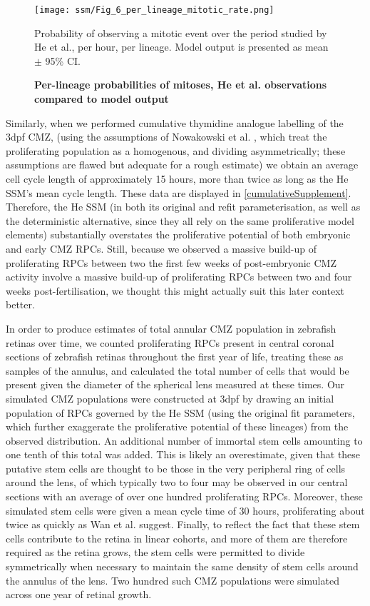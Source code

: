 \begin{figure}[!h]
\texttt{[image: ssm/Fig\_6\_per\_lineage\_mitotic\_rate.png]}
\caption{{\bf Per-lineage probabilities of mitoses, He et al. observations compared to model output}}
Probability of observing a mitotic event over the period studied by He et al., per hour, per lineage. Model output is presented as mean $\pm$ 95\% CI.
\label{PerLineageFig}
\end{figure}

Similarly, when we performed cumulative thymidine analogue labelling of the 3dpf CMZ, (using the assumptions of Nowakowski et al. \cite{Nowakowski1989}, which treat the proliferating population as a homogenous, and dividing asymmetrically; these assumptions are flawed but adequate for a rough estimate) we obtain an average cell cycle length of approximately 15 hours, more than twice as long as the He SSM's mean cycle length. These data are displayed in \ref{cumulativeSupplement}. Therefore, the He SSM (in both its original and refit parameterisation, as well as the deterministic alternative, since they all rely on the same proliferative model elements) substantially overstates the proliferative potential of both embryonic and early CMZ RPCs. Still, because we observed a massive build-up of proliferating RPCs between two the first few weeks of post-embryonic CMZ activity involve a massive build-up of proliferating RPCs between two and four weeks post-fertilisation, we thought this might actually suit this later context better.

In order to produce estimates of total annular CMZ population in zebrafish retinas over time, we counted proliferating RPCs present in central coronal sections of zebrafish retinas throughout the first year of life, treating these as samples of the annulus, and calculated the total number of cells that would be present given the diameter of the spherical lens measured at these times. Our simulated CMZ populations were constructed at 3dpf by drawing an initial population of RPCs governed by the He SSM (using the original fit parameters, which further exaggerate the proliferative potential of these lineages) from the observed distribution. An additional number of immortal stem cells amounting to one tenth of this total was added. This is likely an overestimate, given that these putative stem cells are thought to be those in the very peripheral ring of cells around the lens, of which typically two to four may be observed in our central sections with an average of over one hundred proliferating RPCs. Moreover, these simulated stem cells were given a mean cycle time of 30 hours, proliferating about twice as quickly as Wan et al. suggest. Finally, to reflect the fact that these stem cells contribute to the retina in linear cohorts\cite{Centanin2014}, and more of them are therefore required as the retina grows, the stem cells were permitted to divide symmetrically when necessary to maintain the same density of stem cells around the annulus of the lens. Two hundred such CMZ populations were simulated across one year of retinal growth.

